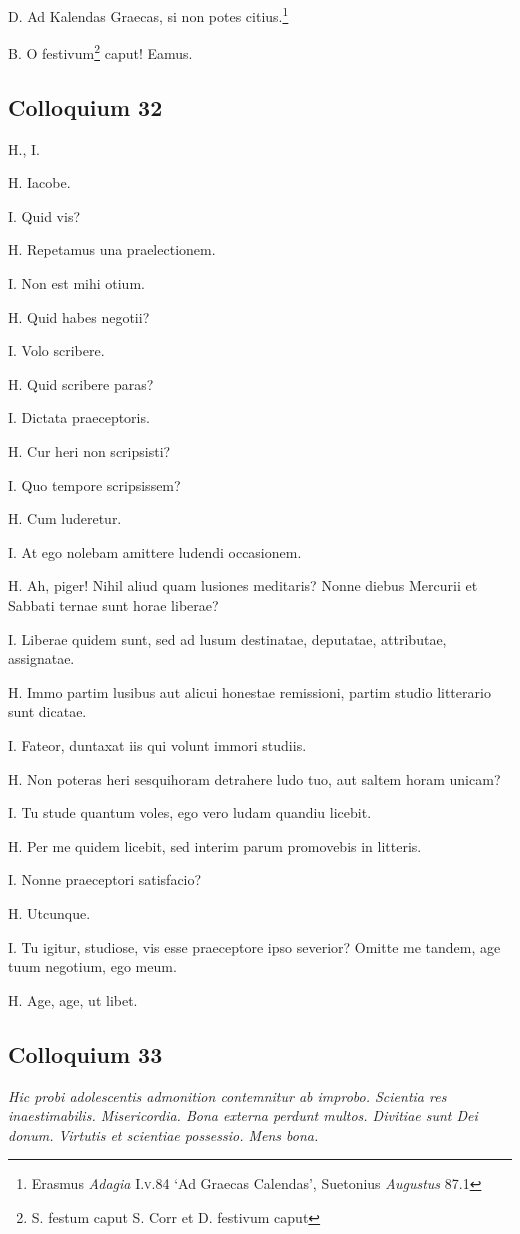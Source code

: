\documentclass{article}
\begin{document}
D. Ad Kalendas Graecas, si non potes citius.\footnote{Erasmus \emph{Adagia} I.\textsc{v}.84 `Ad Graecas Calendas', Suetonius \emph{Augustus} 87.1}

B. O festivum\footnote{S. festum caput S. Corr et D. festivum caput} caput! Eamus.

\subsection{Colloquium 32}
H., I.

H. Iacobe. 

I. Quid vis?

H. Repetamus una praelectionem. 

I. Non est mihi otium. 

H. Quid habes negotii?

I. Volo scribere. 

H. Quid scribere paras?

I. Dictata praeceptoris. 

H. Cur heri non scripsisti?

I. Quo tempore scripsissem?

H. Cum luderetur. 

I. At ego nolebam amittere ludendi occasionem. 

H. Ah, piger! Nihil aliud quam lusiones meditaris? Nonne diebus Mercurii et Sabbati ternae sunt horae liberae?

I. Liberae quidem sunt, sed ad lusum destinatae, deputatae, attributae, assignatae. 

H. Immo partim lusibus aut alicui honestae remissioni, partim studio litterario sunt dicatae.
 
I. Fateor, duntaxat iis qui volunt immori studiis. 

H. Non poteras heri sesquihoram detrahere ludo tuo, aut saltem horam unicam?

I. Tu stude quantum voles, ego vero ludam quandiu licebit. 

H. Per me quidem licebit, sed interim parum promovebis in litteris. 

I. Nonne praeceptori satisfacio?

H. Utcunque. 

I. Tu igitur, studiose, vis esse praeceptore ipso severior? Omitte me tandem, age tuum negotium, ego meum. 

H. Age, age, ut libet. 

\subsection{Colloquium 33}
\emph{Hic probi adolescentis admonition contemnitur ab improbo. Scientia res inaestimabilis. Misericordia. Bona externa perdunt multos. Divitiae sunt Dei donum. Virtutis et scientiae possessio. Mens bona.}
\end{document}
